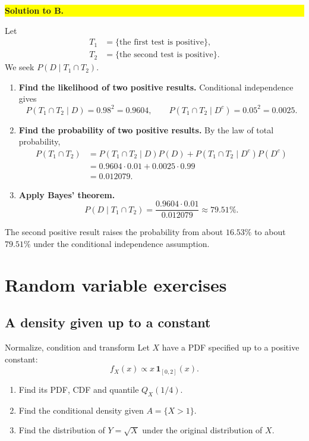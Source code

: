 \documentclass[a4paper,12pt,oneside]{report}
\newcommand{\solutionheading}[1]{%
  \par\Needspace{5\baselineskip}\noindent
  \begingroup\setlength{\fboxsep}{1pt}%
  \colorbox{yellow}{\strut\textbf{#1}}\endgroup\par\nobreak}
\begin{document}
\solutionheading{Solution to B.}
Let
\[
  \begin{aligned}
    T_1&=\{\text{the first test is positive}\},\\
    T_2&=\{\text{the second test is positive}\}.
  \end{aligned}
\]
We seek $P(D\mid T_1\cap T_2)$.
\begin{enumerate}[label=\textbf{Step \arabic*:},leftmargin=*]
  \item \textbf{Find the likelihood of two positive results.} Conditional
  independence gives
  \[
    P(T_1\cap T_2\mid D)=0.98^2=0.9604,
    \qquad
    P(T_1\cap T_2\mid D^c)=0.05^2=0.0025.
  \]
  \item \textbf{Find the probability of two positive results.} By the
  law of total probability,
  \begin{align*}
    P(T_1\cap T_2)
      &=P(T_1\cap T_2\mid D)P(D)
        +P(T_1\cap T_2\mid D^c)P(D^c)\\
      &=0.9604\cdot0.01+0.0025\cdot0.99\\
      &=0.012079.
  \end{align*}
  \item \textbf{Apply Bayes' theorem.}
  \[
    \boxed{P(D\mid T_1\cap T_2)
      =\frac{0.9604\cdot0.01}{0.012079}
      \approx 79.51\%.}
  \]
\end{enumerate}
The second positive result raises the probability from about $16.53\%$
to about $79.51\%$ under the conditional independence assumption.
\chapter{Random variable exercises}

\section{A density given up to a constant}
\label{sec:october-14-exercise-1}

\begin{framedexercise}{Normalize, condition and transform}
Let $X$ have a PDF specified up to a positive constant:
\[
  f_X(x)\propto x\,\mathbf1_{[0,2]}(x).
\]
\begin{enumerate}[label=(\arabic*)]
  \item Find its PDF, CDF and quantile $Q_X(1/4)$.
  \item Find the conditional density given $A=\{X>1\}$.
  \item Find the distribution of $Y=\sqrt X$ under the original
    distribution of $X$.
\end{enumerate}
\end{framedexercise}
\end{document}
